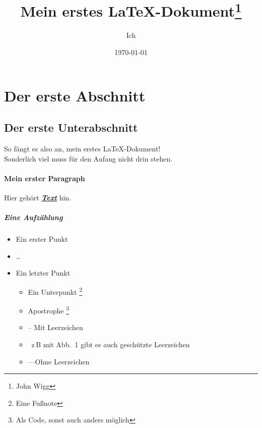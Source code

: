 \documentclass[a4paper, 10pt,onecolumn]{scrartcl}
\title{Mein erstes \LaTeX-Dokument\thanks{John Wigg}}
\author{Ich} %
\date{\today}
\begin{document}
\tableofcontents
\maketitle
\section{Der erste Abschnitt}
\subsection{Der erste Unterabschnitt}

So fängt es also an, mein erstes \LaTeX-Dokument!\\
Sonderlich viel muss für den Anfang nicht drin stehen.

\paragraph{Mein erster Paragraph}

Hier gehört \textbf{\underline{\emph{Text}}} hin.
\subparagraph{Eine Aufzählung}
\begin{itemize}
	\item Ein erster Punkt
	\item \dots
	\item Ein letzter Punkt
	\begin{itemize}
		\item Ein Unterpunkt \footnote[10]{Eine Fußnote}
		\item Apostrophe \footnote{Als Code, sonst auch anders möglich} 
		\item \glqq{}--\grqq{} Mit Leerzeichen
		\item \glq\-\grq\, z\,B mit Abb.~1 gibt es auch geschützte Leerzeichen
		\item \glqq---\grqq Ohne Leerzeichen
	\end{itemize}
\end{itemize}
\end{document}
